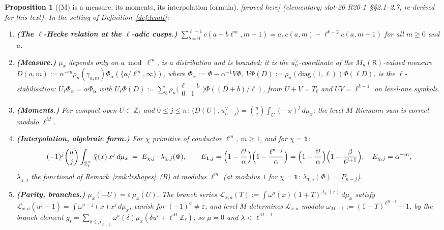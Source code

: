 \documentclass[11pt]{article}
\newtheorem{proposition}[theorem]{Proposition}
\theoremstyle{remark}
\newcommand{\Z}{\mathbb{Z}}
\newcommand{\Mn}{M_n}
\newcommand{\PROVED}{\textsf{[proved here]}}
\begin{document}
\begin{proposition}[(M) is a measure, its moments, its interpolation formula]\label{prop:lvmtt}
\PROVED{} (elementary; slot-20 R20-1~\S\S2.1--2.7, re-derived for this text). In the setting of Definition~\ref{def:lvmtt}:
\begin{enumerate}
\item \textbf{(The $\ell$-Hecke relation at the $\ell$-adic cusps.)} $\sum_{b=0}^{\ell-1}c(a+b\ell^{m},m+1)=a_\ell\,c(a,m)-\ell^{k-2}c(a,m-1)$ for all $m\ge0$ and $a$.
\item \textbf{(Measure.)} $\mu_x$ depends only on $a\bmod\ell^{m}$, is a distribution and is bounded: it is the $u_n^{\vee}$-coordinate of the $\Mn(\mathsf R)$-valued measure
  $D(a,m):=\alpha^{-m}\rho_n(\gamma_{a,m})\Phi_\alpha(\{a/\ell^{m},\infty\})$, where $\Phi_\alpha:=\Phi-\alpha^{-1}V\Phi$, $V\Phi(D):=\rho_n(\mathrm{diag}(1,\ell))\Phi(\ell D)$, is the
  $\ell$-stabilisation: $U_\ell\Phi_\alpha=\alpha\Phi_\alpha$ with $U_\ell\Phi(D):=\sum_b\rho_n\bigl(\begin{smallmatrix}\ell&-b\\0&1\end{smallmatrix}\bigr)\Phi((D+b)/\ell)$, from $U+V=T_\ell$ and
  $UV=\ell^{k-1}$ on level-one symbols.
\item \textbf{(Moments.)} For compact open $U\subset\Z_\ell$ and $0\le j\le n$: $\langle D(U),u_{n-j}^{\vee}\rangle=\binom nj\int_U(-x)^{j}\,d\mu_x$; the level-$M$ Riemann sum is
  correct modulo $\ell^{M}$.
\item \textbf{(Interpolation, algebraic form.)} For $\chi$ primitive of conductor $\ell^{m}$, $m\ge1$, and for $\chi=\mathbf 1$:
  \[
    (-1)^{j}\binom nj\int_{\Z_\ell^{\times}}\bar\chi(x)\,x^{j}\,d\mu_x\;=\;E_{\chi,j}\cdot\lambda_{\chi,j}(\Phi),\qquad
    E_{\mathbf 1,j}=\Bigl(1-\frac{\ell^{j}}{\alpha}\Bigr)\Bigl(1-\frac{\ell^{n-j}}{\alpha}\Bigr)=\Bigl(1-\frac{\ell^{j}}{\alpha}\Bigr)\Bigl(1-\frac{\beta}{\ell^{j+1}}\Bigr),\quad E_{\chi,j}=\alpha^{-m},
  \]
  $\lambda_{\chi,j}$ the functional of Remark~\ref{rmk:lvshapes}~(B) at modulus $\ell^{m}$ (at modulus $1$ for $\chi=\mathbf 1$: $\lambda_{\mathbf 1,j}(\Phi)=P_{n-j}$).
\item \textbf{(Parity, branches.)} $\mu_x(-U)=\varepsilon\,\mu_x(U)$. The \emph{branch series} $\mathcal L_{x,a}(T):=\int\omega^{a}(x)(1+T)^{\ell_u(x)}\,d\mu_x$ satisfy
  $\mathcal L_{x,a}(u^{j}-1)=\int\omega^{a-j}(x)x^{j}\,d\mu_x$, vanish for $(-1)^{a}\ne\varepsilon$, and level $M$ determines $\mathcal L_{x,a}$ modulo
  $\omega_{M-1}:=(1+T)^{\ell^{M-1}}-1$, by the branch element $g_i=\sum_{\delta\in\mu_{\ell-1}}\omega^{a}(\delta)\mu_x(\delta u^{i}+\ell^{M}\Z_\ell)$; so $\mu=0$ and $\lambda<\ell^{M-1}$

\end{enumerate}
\end{proposition}
\end{document}
